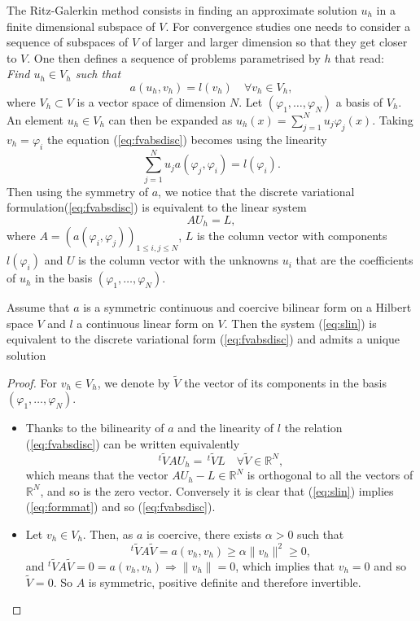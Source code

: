 The Ritz-Galerkin method consists in finding an approximate solution
$u_h$ in a finite dimensional subspace of $V$. For convergence studies one needs to consider a sequence of subspaces of $V$ of larger and larger dimension
so that they get closer to $V$. One then defines a sequence of problems parametrised by  $h$ that read:\\
{\it Find $u_h\in V_h$ such that }
\begin{equation}
  \label{eq:fvabsdisc}
  a(u_h,v_h)=l(v_h)\quad\forall v_h\in V_h,
\end{equation}
where $V_h\subset V$ is a vector space of dimension $N$. 
Let $(\varphi_1,\dots,\varphi_N)$ a basis of $V_h$. An element $u_h\in V_h$
can then be expanded as $u_h(x)=\sum_{j=1}^N u_j\varphi_j(x)$. Taking
$v_h=\varphi_i$ the equation (\ref{eq:fvabsdisc}) becomes using the linearity
$$\sum_{j=1}^N u_j a(\varphi_j,\varphi_i) = l(\varphi_i).$$
Then using the symmetry of $a$, we notice that
the discrete variational formulation(\ref{eq:fvabsdisc}) is equivalent
to the linear system
\begin{equation}
  \label{eq:slin}
  AU_h=L,
\end{equation}
where $A=(a(\varphi_i,\varphi_j))_{1\leq i,j \leq N}$, $L$ is the column vector with components $l(\varphi_i)$ and $U$ is the column vector with the unknowns $u_i$ that are the coefficients of
$u_h$ in the basis $(\varphi_1,\dots,\varphi_N)$.

\begin{theorem}
  Assume that  $a$ is a symmetric continuous and coercive bilinear form on a Hilbert space $V$ and $l$ a continuous linear form on $V$.
Then the system (\ref{eq:slin}) is equivalent to the discrete variational form  (\ref{eq:fvabsdisc}) and admits a unique solution
\end{theorem}
\begin{proof}
    For $v_h\in V_h$, we denote by $\tilde{V}$ the vector of its components in the basis $(\varphi_1,\dots,\varphi_N)$.
  \begin{itemize}
  \item Thanks to the bilinearity of  $a$ and the linearity of $l$ the relation (\ref{eq:fvabsdisc})
can be written equivalently
\begin{equation}\label{eq:formmat}
^t\tilde{V}AU_h=\,^t\tilde{V}L\quad\forall \tilde{V}\in \mathbb{R}^N,
\end{equation}
which means that the vector $AU_h-L\in \mathbb{R}^N$ is orthogonal to all the vectors of $ \mathbb{R}^N$, and so is the zero vector. Conversely it is clear that (\ref{eq:slin}) implies (\ref{eq:formmat})
and so (\ref{eq:fvabsdisc}).
  \item Let $v_h\in V_h$.  Then, as $a$ is
    coercive, there exists $\alpha>0$ such that
    $$^t\tilde{V}A\tilde{V}=a(v_h,v_h) \geq \alpha \|v_h\|^2\geq
    0,$$
    and $^t\tilde{V}A\tilde{V}=0=a(v_h,v_h) \Rightarrow
    \|v_h\|=0$, which implies that $v_h=0$ and so $\tilde{V}=0$.
    So $A$ is symmetric, positive definite and therefore invertible.
  \end{itemize}
\end{proof}

